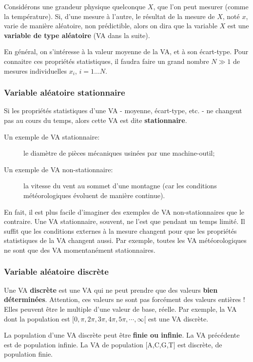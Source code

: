 \documentclass[main.tex]{subfiles}
\begin{document}
Considérons une grandeur physique quelconque $X$, que l'on peut mesurer (comme la température). Si, d'une mesure à l'autre, le résultat de la mesure de $X$, noté $x$, varie de manière aléatoire, non prédictible, alors on dira que la variable $X$ est une \textbf{variable de type aléatoire} (VA dans la suite).

En général, on s'intéresse à la valeur moyenne de la VA, et à son écart-type. Pour connaitre ces propriétés statistiques, il faudra faire un grand nombre $N\gg 1$ de mesures individuelles $x_i$, $i=1\dots N$.

\subsubsection{Variable aléatoire stationnaire}

Si les propriétés statistiques d'une VA - moyenne, écart-type, etc. - ne changent pas au cours du temps, alors cette VA est dite \textbf{stationnaire}.
\begin{description}
    \item[Un exemple de VA stationnaire:] le diamètre de pièces mécaniques usinées par une machine-outil;
    \item[Un exemple de VA non-stationnaire:] la vitesse du vent au sommet d'une montagne (car les conditions météorologiques évoluent de manière continue).
\end{description}
En fait, il est plus facile d'imaginer des exemples de VA non-stationnaires que le contraire. Une VA stationnaire, souvent, ne l'est que pendant un temps limité. Il suffit que les conditions externes à la mesure changent pour que les propriétés statistiques de la VA changent aussi. Par exemple, toutes les VA météorologiques ne sont que des VA momentanément stationnaires.

\subsubsection{Variable aléatoire discrète}

Une VA \textbf{discrète} est une VA qui ne peut prendre que des valeurs \textbf{bien déterminées}. Attention, ces valeurs ne sont pas forcément des valeurs entières ! Elles peuvent être le multiple d'une valeur de base, réelle. Par exemple, la VA dont la population est $[0,\pi,2\pi,3\pi,4\pi,5\pi,\cdots,\infty[$ est une VA discrète.

La population d'une VA discrète peut être \textbf{finie ou infinie}. La VA précédente est de population infinie. La VA de population [A,C,G,T] est discrète, de population finie.
\end{document}
